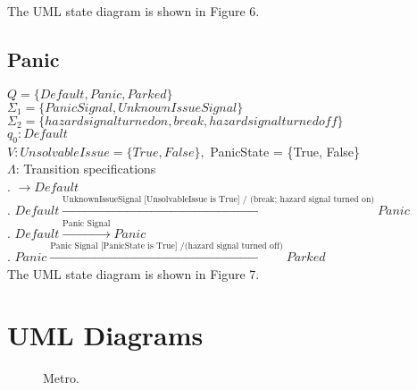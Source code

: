 \documentclass[12pt]{article}
\begin{document}
\begin{spacing}{1.5}
\noindent The UML state diagram is shown in Figure 6.

\newpage

\subsection{Panic}

\noindent $Q = \{Default, Panic, Parked\}$\\
\noindent $\Sigma_1 = \{Panic Signal, UnknownIssueSignal\}$\\
\noindent $\Sigma_2 = \{hazard signal turned on, break, hazard signal turned off\}$\\
\noindent $q_0: Default$\\
\noindent $V: UnsolvableIssue = \{True, False\}, $ PanicState = \{True, False\}\\
\noindent $\Lambda$: Transition specifications\\

. $\rightarrow Default$\\
. $Default \xrightarrow {\text {UnknownIssueSignal [UnsolvableIssue is True] / (break;~hazard~signal~turned on)}} Panic$\\
. $Default \xrightarrow {\text {Panic Signal}} Panic$\\
. $Panic \xrightarrow {\text {Panic Signal [PanicState is True] /(hazard~signal~turned~off)}} Parked$\\


\noindent The UML state diagram is shown in Figure 7.

\newpage

\section{UML Diagrams}

\begin{figure}[h!]
	\centering
		
		  \caption{Metro.}
  \label{fig:metro-fig}
\end{figure}

\end{spacing}
\end{document}
